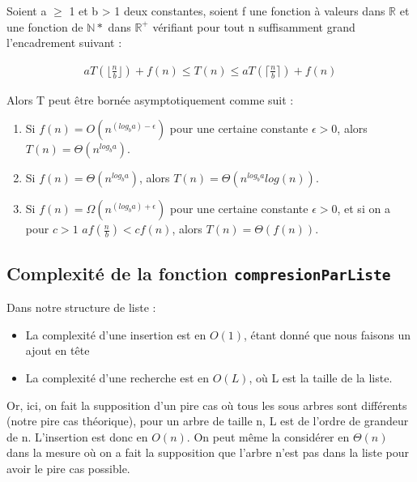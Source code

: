 \documentclass[12pt,a4paper]{article}
\begin{document}
\begin{tcolorbox}

Soient a $\geq$ 1 et b > 1 deux constantes, soient f une fonction à valeurs dans $\mathbb{R}$ et une fonction de $\mathbb{N}*$ dans $\mathbb{R}^+$ vérifiant pour tout n suffisamment grand l'encadrement suivant : 


\begin{align}
aT(\lfloor\frac{n}{b}\rfloor) + f(n)\leq T(n) \leq aT(\lceil\frac{n}{b}\rceil) + f(n)
\end{align}

Alors T peut être bornée asymptotiquement comme suit : 

\begin{enumerate}
\item Si $f(n) = O(n^{(log_b a)- \epsilon})$ pour une certaine constante $\epsilon > 0$, alors $T (n) = \Theta(n^{log_b a})$. \label{th1}
\item Si $f (n) = \Theta(n^{log_b a})$, alors $T (n) = \Theta(n^{log_b a} log (n))$. \label{th2}
\item Si $f (n) = \Omega(n^{(log_b a)+\epsilon})$ pour une certaine constante $\epsilon > 0$, et si on a pour $c > 1$ $af(\frac{n}{b}) < cf(n)$, alors $T (n) = \Theta(f(n))$. \label{th3}
\end{enumerate}




\end{tcolorbox}


\subsection{Complexité de la fonction \texttt{compresionParListe}}

Dans notre structure de liste : 
\begin{itemize}
\item La complexité d'une insertion est en $O(1)$, étant donné que nous faisons un ajout en tête
\item La complexité d'une recherche est en $O(L)$, où L est la taille de la liste.
\end{itemize}

Or, ici, on fait la supposition d'un pire cas où tous les sous arbres sont différents (notre pire cas théorique), pour un arbre de taille n, L est de l'ordre de grandeur de n. L'insertion est donc en $O(n)$. On peut même la considérer en $\Theta(n)$ dans la mesure où on a fait la supposition que l'arbre n'est pas dans la liste pour avoir le pire cas possible.
\end{document}
